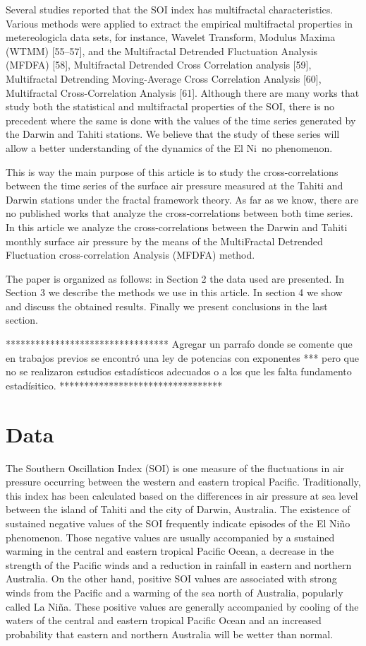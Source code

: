 \documentclass[onecolumn, preprint,aps,amsmath, amssymb, superscriptaddress]{revtex4}
\begin{document}
Several studies reported that the SOI index has multifractal characteristics. Various methods were applied to extract the empirical multifractal properties in metereologicla data sets, for instance, Wavelet Transform, Modulus Maxima (WTMM) [55–57], and the Multifractal Detrended Fluctuation Analysis (MFDFA) [58], Multifractal Detrended Cross Correlation analysis [59], Multifractal Detrending Moving-Average Cross Correlation Analysis [60], Multifractal Cross-Correlation Analysis [61]. Although there are many works that study both the statistical and multifractal properties of the SOI, there is no precedent where the same is done with the values of the time series generated by the Darwin and Tahiti stations. We believe that the study of these series will allow a better understanding of the dynamics of the El Ni~no phenomenon.

This is way the main purpose of this article is to study the cross-correlations between the time series of the surface air pressure measured at the Tahiti and Darwin stations under the fractal framework theory. As far as we know, there are no published works that analyze the cross-correlations between both time series. In this article we analyze the cross-correlations between the Darwin and Tahiti monthly surface air pressure by the means of the MultiFractal Detrended Fluctuation cross-correlation Analysis (MFDFA) method.

The paper is organized as follows: in Section 2 the data used are presented. In Section 3 we describe the methods we use in this article. In section 4 we show and discuss the obtained results. Finally we present conclusions in the last section. 

*********************************
Agregar un parrafo donde se comente que en trabajos previos se encontró una ley de potencias con exponentes *** pero que no se realizaron estudios estadísticos adecuados o a los que les falta fundamento estadísitico.
*********************************

\section{Data}
\label{sec:Data}

The Southern Oscillation Index (SOI) is one measure of the fluctuations in air pressure occurring between the western and eastern tropical Pacific. Traditionally, this index has been calculated based on the differences in air pressure at sea level between the island of Tahiti and the city of Darwin, Australia. The existence of sustained negative values of the SOI frequently indicate episodes of the El Niño phenomenon. Those negative values are usually accompanied by a sustained warming in the central and eastern tropical Pacific Ocean, a decrease in the strength of the Pacific winds and  a reduction in rainfall in eastern and northern Australia.  On the other hand, positive SOI values are associated with strong winds from the Pacific and a warming of the sea north of Australia, popularly called La Niña. These positive values are generally accompanied by cooling of the waters of the central and eastern tropical Pacific Ocean and an increased probability that eastern and northern Australia will be wetter than normal.
\end{document}
